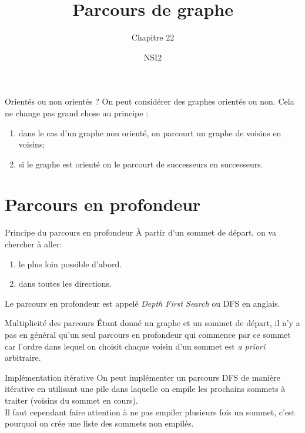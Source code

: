 \documentclass[10pt]{beamer}
\title{Parcours de graphe}
\subtitle{Chapitre 22}
\author{NSI2}
\begin{document}
\maketitle

\begin{frame}{Orientés ou non orientés ?}
On peut considérer des graphes orientés ou non. Cela ne change pas grand chose au principe :
\begin{enumerate}[--]
	\item dans le cas d'un graphe non orienté, on parcourt un graphe de voisins en voisins;
    \item si le graphe est orienté on le parcourt de successeurs en successeurs.
\end{enumerate}
\end{frame}

\section*{Parcours en profondeur}
\begin{frame}{Principe du parcours en profondeur}
À partir d'un sommet de départ, on va chercher à aller:
\begin{enumerate}[\bfseries 1.]
	\item le plus \og loin\fg{} possible d'abord.
    \item dans toutes les directions.
\end{enumerate}
Le parcours en profondeur est appelé \textit{Depth First Search} ou DFS en anglais.
\end{frame}
\begin{frame}{Multiplicité des parcours}
\'Etant donné un graphe et un sommet de départ, il n'y a pas en général qu'un seul parcours en profondeur qui commence par ce sommet car l'ordre dans lequel on choisit chaque voisin d'un
sommet est \textit{a priori} arbitraire.
\end{frame}
\begin{frame}{Implémentation itérative}
On peut implémenter un parcours DFS de manière itérative en utilisant une \alert{pile} dans laquelle on empile les prochains sommets à traiter (voisins du sommet en cours).\\
Il faut cependant faire attention à ne pas empiler plusieurs fois un sommet, c'est pourquoi on crée une liste des sommets non empilés.
\end{frame}
\end{document}
